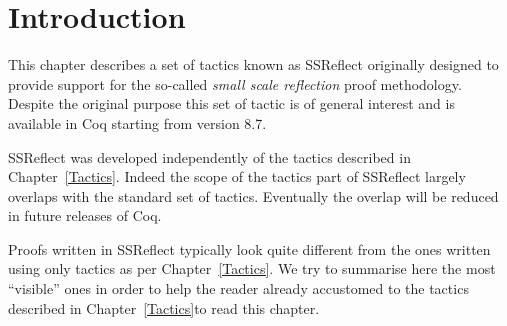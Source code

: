 
\newcommand{\ssr}{{\sc SSReflect}}

\ifhevea\newcommand{\ssrC}[1]{\texttt{#1}}\else\newcommand{\ssrC}[1]{\text{\lstinline!#1!}}\fi
\ifhevea\renewenvironment{center}{\@open{div}{class="center"}\@open{div}{class="centered"}}{\@close{div}\@close{div}}\fi
\newcommand\ssrN[2][]{{\textsl {#2}}\ensuremath{_{#1}}}
\ifhevea\newcommand{\underbar}[1]{\underline{#1}}\fi

\let\ssrL=\lstinline

\newcommand{\iitem}{{\it i-item}}
\newcommand{\ditem}{{\it d-item}}
\newcommand{\optional}[1]{{\it[}#1{\it]}}
\newcommand{\optsep}{{\it|}}
\newcommand{\idx}[1]{\tacindex{#1 (ssreflect)}}
\newcommand{\idxC}[1]{\comindex{#1 (ssreflect)}}

\newenvironment{new}%
  {\begin{Sbox}\begin{minipage}{0.97\textwidth}%
    \begin{flushright}\textcolor{red}{\fbox{Version 1.3}}%
      \end{flushright}\noindent}%
  {\end{minipage}\end{Sbox}\noindent\doublebox{\TheSbox}}
\section{Introduction}\label{sec:intro}

This chapter describes a set of tactics known as \ssr{}
originally designed to provide support for the so-called \emph{small scale
reflection} proof methodology.  Despite the original purpose this set of tactic
is of general interest and is available in Coq starting from version 8.7.

\ssr{} was developed independently of the tactics described in
Chapter~\ref{Tactics}.  Indeed the scope of the tactics part of
\ssr{} largely overlaps with the standard set of tactics.  Eventually
the overlap will be reduced in future releases of Coq.

Proofs written in \ssr{} typically look quite different from the
ones written using only tactics as per Chapter~\ref{Tactics}.
We try to summarise here the most ``visible'' ones in order to
help the reader already accustomed to the tactics described in
Chapter~\ref{Tactics}to read this chapter.

